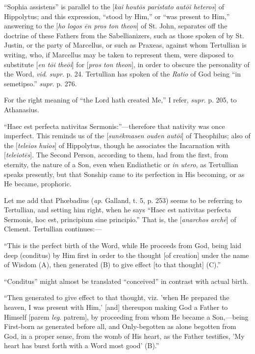 ``Sophia assistens'' is parallel to the [\emph{kai hout\={o}s
paristato aut\={o}i heteros}] of Hippolytus; and this
expression, ``stood by Him,'' or ``was present to
Him,'' answering to the [\emph{ho logos \={e}n pros ton theon}]
of St. John, separates off the doctrine of these Fathers from the
Sabellianizers, such as those spoken of by St. Justin, or the party of
Marcellus, or such as Praxeas, against whom Tertullian is writing,
who, if Marcellus may be taken to represent them, were disposed to
substitute [\emph{en t\={o}i the\={o}i}] for [\emph{pros ton theon}],
in order to obscure the personality of the Word, \emph{vid}. \emph{supr}.
p. 24. Tertullian has spoken of the \emph{Ratio} of God being ``in
semetipso.'' \emph{supr}. p. 276.

For the right meaning of ``the Lord hath created Me,'' I
refer, \emph{supr}. p. 205, to Athanasius.

``Haec est perfecta nativitas Sermonis:''—therefore that
nativity was once imperfect. This reminds us of the [\emph{sun\={e}kmasen
ouden aut\={o}i}] of Theophilus; also of the [\emph{teleios huios}]
of Hippolytus, though he associates the Incarnation with [\emph{teleiot\={e}s}].
The Second Person, according to them, had from the first, from
eternity, the nature of a Son, even when Endiathetic or \emph{in utero},
as Tertullian speaks presently, but that Sonship came to its
perfection in His becoming, or as He became, prophoric.

Let me add that Phœbadius (\emph{ap}. Galland, t. 5, p. 253) seems
to be referring to Tertullian, and setting him right, when he
says ``Haec est nativitas perfecta Sermonis, hoc est, principium
sine principio.'' That is, the [\emph{anarchos arch\={e}}] of
Clement. Tertullian continues:—

``This is the perfect birth of the Word, while He proceeds from
God, being laid deep (conditus) by Him first in order to the thought
[of creation] under the name of Wisdom (A), then generated (B) to give
effect [to that thought] (C).''

``Conditus'' might almost be translated
``conceived'' in contrast with actual birth.

``Then generated to give effect to that thought, viz. 'when He
prepared the heaven, I was present with Him,' [and] thereupon making
God a Father to Himself [parem \emph{leg}. patrem], by proceeding from
whom He became a Son,—being First-born as generated before all, and
Only-begotten as alone begotten from God, in a proper sense, from the
womb of His heart, as the Father testifies, 'My heart has burst forth
with a Word most good' (B).''

